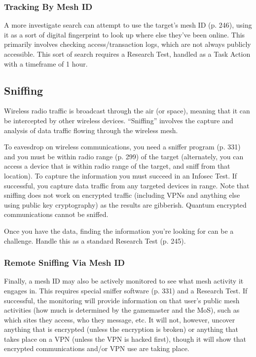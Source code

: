 \subsubsection{Tracking By Mesh ID}

A more investigate search can attempt to use the 
target's mesh ID (p. 246), using it as a sort of digital 
fingerprint to look up where else they've been online. 
This primarily involves checking access/transaction 
logs, which are not always publicly accessible. This 
sort of search requires a Research Test, handled as a 
Task Action with a timeframe of 1 hour.

\subsection{Sniffing}

Wireless radio traffic is broadcast through the air (or 
space), meaning that it can be intercepted by other wireless
devices. ``Sniffing'' involves the capture and analysis
of data traffic flowing through the wireless mesh.

To eavesdrop on wireless communications, you need 
a sniffer program (p. 331) and you must be within 
radio range (p. 299) of the target (alternately, you can 
access a device that is within radio range of the target, 
and sniff from that location). To capture the information
you must succeed in an Infosec Test. If successful,
you capture data traffic from any targeted devices in 
range. Note that sniffing does not work on encrypted 
traffic (including VPNs and anything else using public 
key cryptography) as the results are gibberish. Quantum
encrypted communications cannot be sniffed.

Once you have the data, finding the information 
you're looking for can be a challenge. Handle this as 
a standard Research Test (p. 245).

\subsubsection{Remote Sniffing Via Mesh ID}

Finally, a mesh ID may also be actively monitored 
to see what mesh activity it engages in. This requires 
special sniffer software (p. 331) and a Research Test. 
If successful, the monitoring will provide information 
on that user's public mesh activities (how much is 
determined by the gamemaster and the MoS), such 
as which sites they access, who they message, etc. It 
will not, however, uncover anything that is encrypted 
(unless the encryption is broken) or anything that 
takes place on a VPN (unless the VPN is hacked first), 
though it will show that encrypted communications 
and/or VPN use are taking place.

